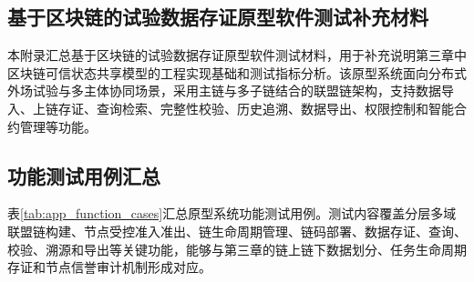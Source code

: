 
\begin{appendices}
  \chapter{基于区块链的试验数据存证原型软件测试补充材料}
  \label{app:prototype_test}

  本附录汇总基于区块链的试验数据存证原型软件测试材料，用于补充说明第三章中区块链可信状态共享模型的工程实现基础和测试指标分析。该原型系统面向分布式外场试验与多主体协同场景，采用主链与多子链结合的联盟链架构，支持数据导入、上链存证、查询检索、完整性校验、历史追溯、数据导出、权限控制和智能合约管理等功能。

  \section{功能测试用例汇总}

  表\ref{tab:app_function_cases}汇总原型系统功能测试用例。测试内容覆盖分层多域联盟链构建、节点受控准入准出、链生命周期管理、链码部署、数据存证、查询、校验、溯源和导出等关键功能，能够与第三章的链上链下数据划分、任务生命周期存证和节点信誉审计机制形成对应。


\end{appendices}
